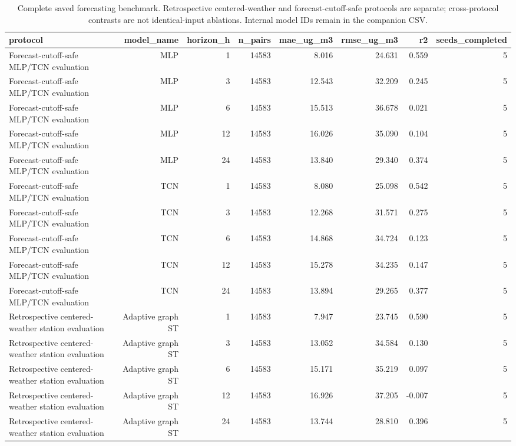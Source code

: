 \begin{table}[t]
\centering
\scriptsize
\caption{Complete saved forecasting benchmark. Retrospective centered-weather and forecast-cutoff-safe protocols are separate; cross-protocol contrasts are not identical-input ablations. Internal model IDs remain in the companion CSV.}
\label{tab:t02_complete_forecasting_benchmark}
\begin{tabular}{lrrrrrrr}
\hline
protocol & model\_name & horizon\_h & n\_pairs & mae\_ug\_m3 & rmse\_ug\_m3 & r2 & seeds\_completed \\
\hline
Forecast-cutoff-safe MLP/TCN evaluation & MLP & 1 & 14583 & 8.016 & 24.631 & 0.559 & 5 \\
Forecast-cutoff-safe MLP/TCN evaluation & MLP & 3 & 14583 & 12.543 & 32.209 & 0.245 & 5 \\
Forecast-cutoff-safe MLP/TCN evaluation & MLP & 6 & 14583 & 15.513 & 36.678 & 0.021 & 5 \\
Forecast-cutoff-safe MLP/TCN evaluation & MLP & 12 & 14583 & 16.026 & 35.090 & 0.104 & 5 \\
Forecast-cutoff-safe MLP/TCN evaluation & MLP & 24 & 14583 & 13.840 & 29.340 & 0.374 & 5 \\
Forecast-cutoff-safe MLP/TCN evaluation & TCN & 1 & 14583 & 8.080 & 25.098 & 0.542 & 5 \\
Forecast-cutoff-safe MLP/TCN evaluation & TCN & 3 & 14583 & 12.268 & 31.571 & 0.275 & 5 \\
Forecast-cutoff-safe MLP/TCN evaluation & TCN & 6 & 14583 & 14.868 & 34.724 & 0.123 & 5 \\
Forecast-cutoff-safe MLP/TCN evaluation & TCN & 12 & 14583 & 15.278 & 34.235 & 0.147 & 5 \\
Forecast-cutoff-safe MLP/TCN evaluation & TCN & 24 & 14583 & 13.894 & 29.265 & 0.377 & 5 \\
Retrospective centered-weather station evaluation & Adaptive graph ST & 1 & 14583 & 7.947 & 23.745 & 0.590 & 5 \\
Retrospective centered-weather station evaluation & Adaptive graph ST & 3 & 14583 & 13.052 & 34.584 & 0.130 & 5 \\
Retrospective centered-weather station evaluation & Adaptive graph ST & 6 & 14583 & 15.171 & 35.219 & 0.097 & 5 \\
Retrospective centered-weather station evaluation & Adaptive graph ST & 12 & 14583 & 16.926 & 37.205 & -0.007 & 5 \\
Retrospective centered-weather station evaluation & Adaptive graph ST & 24 & 14583 & 13.744 & 28.810 & 0.396 & 5 \\

\end{tabular}
\end{table}
